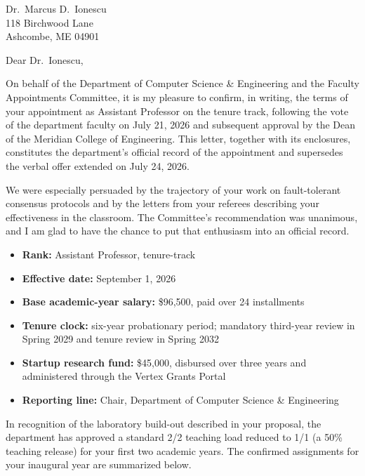 \documentclass[
  fontsize=11pt,
  parskip=half,
  subject=titled,
  backaddress=true,
  fromalign=right,
  fromphone=true,
  fromemail=true,
  fromurl=true,
  addrfield=true,
  foldmarks=false,
  enlargefirstpage=true
]{scrletter}
\begin{document}
\begin{letter}{Dr.~Marcus D.~Ionescu\\118 Birchwood Lane\\Ashcombe, ME 04901}

\opening{Dear Dr.~Ionescu,}

On behalf of the Department of Computer Science \& Engineering and the Faculty Appointments
Committee, it is my pleasure to confirm, in writing, the terms of your appointment as
Assistant Professor on the tenure track, following the vote of the department faculty on
July 21, 2026 and subsequent approval by the Dean of the Meridian College of Engineering.
This letter, together with its enclosures, constitutes the department's official record of
the appointment and supersedes the verbal offer extended on July 24, 2026.

We were especially persuaded by the trajectory of your work on fault-tolerant consensus
protocols and by the letters from your referees describing your effectiveness in the
classroom. The Committee's recommendation was unanimous, and I am glad to have the chance to
put that enthusiasm into an official record.

\begin{center}
\begin{tcolorbox}[meridianbox, width=0.92\textwidth, title=Key Terms of Appointment]
\begin{itemize}
  \item \textbf{Rank:} Assistant Professor, tenure-track
  \item \textbf{Effective date:} September 1, 2026
  \item \textbf{Base academic-year salary:} \$96,500, paid over 24 installments
  \item \textbf{Tenure clock:} six-year probationary period; mandatory third-year review in
        Spring 2029 and tenure review in Spring 2032
  \item \textbf{Startup research fund:} \$45,000, disbursed over three years and administered
        through the Vertex Grants Portal
  \item \textbf{Reporting line:} Chair, Department of Computer Science \& Engineering
\end{itemize}
\end{tcolorbox}
\end{center}

In recognition of the laboratory build-out described in your proposal, the department has
approved a standard 2/2 teaching load reduced to 1/1 (a 50\% teaching release) for your first
two academic years. The confirmed assignments for your inaugural year are summarized below.


\end{letter}
\end{document}
